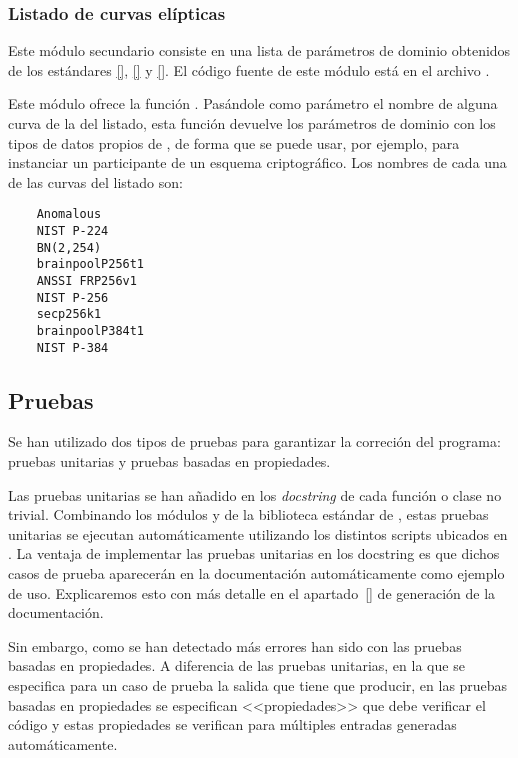 \subsubsection{Listado de curvas elípticas}
\label{subs:Listado de curvas elípticas}

Este módulo secundario consiste en una lista de parámetros de dominio obtenidos de los estándares \ref{}, \ref{} y \ref{}. El código fuente de este módulo está en el archivo .

Este módulo ofrece la función . Pasándole como parámetro el nombre de alguna curva de la del listado, esta función devuelve los parámetros de dominio con los tipos de datos propios de , de forma que se puede usar, por ejemplo, para instanciar un participante de un esquema criptográfico. Los nombres de cada una de las curvas del listado son:
\begin{verbatim}
    Anomalous
    NIST P-224
    BN(2,254)
    brainpoolP256t1
    ANSSI FRP256v1
    NIST P-256
    secp256k1
    brainpoolP384t1
    NIST P-384
\end{verbatim}

\subsection{Pruebas}
\label{sub:Pruebas}

Se han utilizado dos tipos de pruebas para garantizar la correción del programa: pruebas unitarias y pruebas basadas en propiedades.

Las pruebas unitarias se han añadido en los \emph{docstring} de cada función o clase no trivial. Combinando los módulos  y  de la biblioteca estándar de , estas pruebas unitarias se ejecutan automáticamente utilizando los distintos scripts ubicados en . La ventaja de implementar las pruebas unitarias en los docstring es que dichos casos de prueba aparecerán en la documentación automáticamente como ejemplo de uso. Explicaremos esto con más detalle en el apartado~\ref{} de generación de la documentación.

Sin embargo, como se han detectado más errores han sido con las pruebas basadas en propiedades. A diferencia de las pruebas unitarias, en la que se especifica para un caso de prueba la salida que tiene que producir, en las pruebas basadas en propiedades se especifican <<propiedades>> que debe verificar el código y estas propiedades se verifican para múltiples entradas generadas automáticamente.

